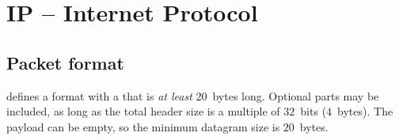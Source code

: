 % 







\section{IP -- Internet Protocol}

\subsection{Packet format}\label{sec:layer3:ip:format}

 defines a  format with a  
that is \textit{at least} $20$~bytes long. Optional parts may be included,
as long as the total header size is a multiple of $32$~bits ($4$~bytes).
The payload can be empty, so the minimum datagram size is $20$~bytes.\\

